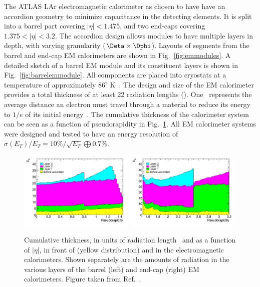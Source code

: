 The ATLAS LAr electromagnetic calorimeter as chosen to have have an accordion geometry to minimize capacitance in the detecting elements. It is split into a barrel part covering $|\eta|<1.475$, and two end-caps covering $1.375<|\eta|<3.2$. The accordion design allows modules to have multiple layers in depth, with varying granularity ($\Deta \times \Dphi$). Layouts of segments from the barrel and end-cap EM calorimeters are shown in Fig.~\ref{fig:emmodules}. A detailed sketch of a barrel EM module and its constituent layers is shown in Fig.~\ref{fig:barrelemmodule}. All components are placed into cryostats at a temperature of approximately $86^{\circ}$ K~\cite{Bremer:449276}.  The design and size of the EM calorimeter provides a total thickness of at least 22 radiation lengths (\radlen). One \radlen\ represents the average distance an electron must travel through a material to reduce its energy to $1/e$ of its initial energy~\cite{Fabjan:2003aq}. The cumulative thickness of the calorimeter system can be seen as a function of pseudorapidity in Fig.~\ref{fig:radiationlengths}. All EM calorimeter systems were designed and tested to have an energy resolution of $\sigma(E_{T})/E_{T}=10\%/\sqrt{E_{T}}\bigoplus0.7\%$.

\begin{figure}[ht]
	\centerline{
		\includegraphics[width=0.49\textwidth]{figures/radiation_lengths_1.pdf} 
		\includegraphics[width=0.49\textwidth]{figures/radiation_lengths_2.pdf} 
	}
	\caption{Cumulative thickness, in units of radiation length \radlen\ and as a function of $|\eta|$, in front of (yellow distribution) and in the electromagnetic calorimeters. Shown separately are the amounts of radiation in the various layers of the barrel (left) and end-cap (right) EM calorimeters. Figure taken from Ref.~\cite{Aad:2008zzm}. }
	\label{fig:radiationlengths}
\end{figure}

